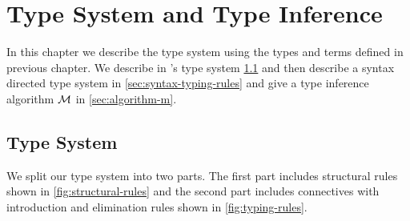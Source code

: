\chapter{Type System and Type Inference}\label{chp:qub-type-system}
In this chapter we describe the type system using the types and terms defined in previous
chapter. We describe in \qub{}'s type system \cref{sec:type-system} and then describe a
syntax directed type system in \cref{sec:syntax-typing-rules} and give a type inference algorithm $\mathcal{M}$ in \cref{sec:algorithm-m}.

\section{Type System}\label{sec:type-system}
We split our type system into two parts. The first part includes structural rules
shown in \cref{fig:structural-rules} and the second part includes connectives with
introduction and elimination rules shown in \cref{fig:typing-rules}.

